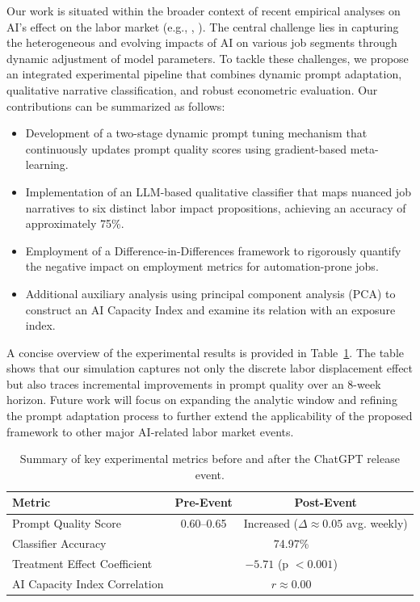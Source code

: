 \documentclass{article} %
\begin{document}
Our work is situated within the broader context of recent empirical analyses on AI’s effect on the labor market (e.g., \cite{liu2023generate}, \cite{qiao2024aijobsinflectionpoint}). The central challenge lies in capturing the heterogeneous and evolving impacts of AI on various job segments through dynamic adjustment of model parameters. To tackle these challenges, we propose an integrated experimental pipeline that combines dynamic prompt adaptation, qualitative narrative classification, and robust econometric evaluation. Our contributions can be summarized as follows:
\begin{itemize}
    \item Development of a two-stage dynamic prompt tuning mechanism that continuously updates prompt quality scores using gradient-based meta-learning.
    \item Implementation of an LLM-based qualitative classifier that maps nuanced job narratives to six distinct labor impact propositions, achieving an accuracy of approximately 75\%.
    \item Employment of a Difference-in-Differences framework to rigorously quantify the negative impact on employment metrics for automation-prone jobs.
    \item Additional auxiliary analysis using principal component analysis (PCA) to construct an AI Capacity Index and examine its relation with an exposure index.
\end{itemize}

A concise overview of the experimental results is provided in Table~\ref{tab:results_summary}. The table shows that our simulation captures not only the discrete labor displacement effect but also traces incremental improvements in prompt quality over an 8-week horizon. Future work will focus on expanding the analytic window and refining the prompt adaptation process to further extend the applicability of the proposed framework to other major AI-related labor market events.

\begin{table}[h]
\centering
\begin{tabular}{lcc}
\hline
\textbf{Metric} & \textbf{Pre-Event} & \textbf{Post-Event} \\
\hline
Prompt Quality Score & 0.60--0.65 & Increased (\(\Delta \approx 0.05\) avg. weekly) \\
Classifier Accuracy & \multicolumn{2}{c}{74.97\%} \\
Treatment Effect Coefficient & \multicolumn{2}{c}{\(-5.71\) (p \(< 0.001\))} \\
AI Capacity Index Correlation & \multicolumn{2}{c}{\(r \approx 0.00\)} \\
\hline
\end{tabular}
\caption{Summary of key experimental metrics before and after the ChatGPT release event.}
\label{tab:results_summary}
\end{table}
\end{document}
